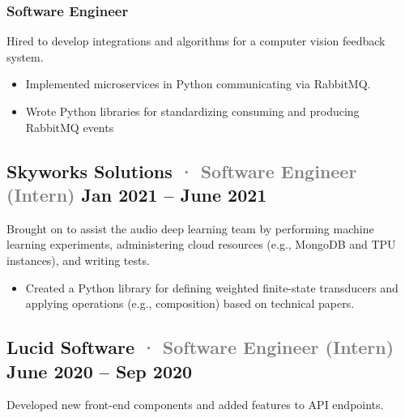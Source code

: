 \documentclass[10pt]{article} %
\providecommand{\tightlist}{%
  \setlength{\itemsep}{0pt}\setlength{\parskip}{0pt}}
\renewcommand{\emph}[1]{%
  \textcolor{gray}{#1}%
}
\begin{document}
\begin{paracol}{2}
\hypertarget{software-engineer}{%
\subsubsection{\texorpdfstring{\small Software
Engineer}{Software Engineer}}\label{software-engineer}}

Hired to develop integrations and algorithms for a computer vision
feedback system.

\begin{itemize}
\tightlist
\item
  Implemented microservices in Python communicating via RabbitMQ.
\item
  Wrote Python libraries for standardizing consuming and producing
  RabbitMQ events
\end{itemize}

\hypertarget{skyworks-solutions-software-engineer-intern-jan-2021-june-2021}{%
\subsection{\texorpdfstring{Skyworks Solutions \emph{· \small Software
Engineer (Intern)} \hfill \small Jan 2021 -- June
2021}{Skyworks Solutions · Software Engineer (Intern) Jan 2021 -- June 2021}}\label{skyworks-solutions-software-engineer-intern-jan-2021-june-2021}}

Brought on to assist the audio deep learning team by performing machine
learning experiments, administering cloud resources (e.g., MongoDB and
TPU instances), and writing tests.

\begin{itemize}
\tightlist
\item
  Created a Python library for defining weighted finite-state
  transducers and applying operations (e.g., composition) based on
  technical papers.
\end{itemize}

\hypertarget{lucid-software-software-engineer-intern-june-2020-sep-2020}{%
\subsection{\texorpdfstring{Lucid Software \emph{· \small Software
Engineer (Intern)} \hfill \small June 2020 -- Sep
2020}{Lucid Software · Software Engineer (Intern) June 2020 -- Sep 2020}}\label{lucid-software-software-engineer-intern-june-2020-sep-2020}}

Developed new front-end components and added features to API endpoints.


\end{paracol}
\end{document}
